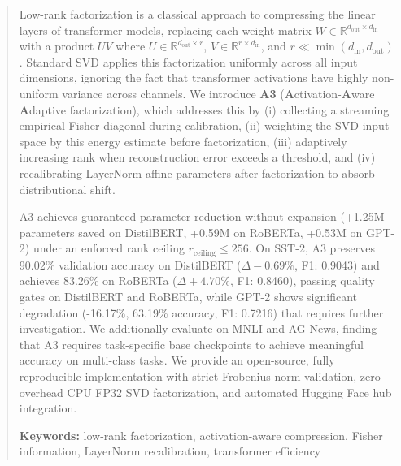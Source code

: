 \documentclass[10pt,twocolumn,letterpaper]{article}
\begin{document}
\maketitle

\begin{abstract}

Low-rank factorization is a classical approach to compressing the linear layers 
of transformer models, replacing each weight matrix $W \in \mathbb{R}^{d_\text{out} \times d_\text{in}}$ 
with a product $U V$ where $U \in \mathbb{R}^{d_\text{out} \times r}$, 
$V \in \mathbb{R}^{r \times d_\text{in}}$, and $r \ll \min(d_\text{in}, d_\text{out})$. 
Standard SVD applies this factorization uniformly across all input dimensions, 
ignoring the fact that transformer activations have highly non-uniform variance 
across channels. We introduce \textbf{A3} (\textbf{A}ctivation-\textbf{A}ware \textbf{A}daptive 
factorization), which addresses this by (i) collecting a streaming empirical 
Fisher diagonal during calibration, (ii) weighting the SVD input space by this 
energy estimate before factorization, (iii) adaptively increasing rank when 
reconstruction error exceeds a threshold, and (iv) recalibrating LayerNorm 
affine parameters after factorization to absorb distributional shift.

A3 achieves guaranteed parameter reduction without expansion (+1.25M parameters saved on DistilBERT, 
+0.59M on RoBERTa, +0.53M on GPT-2) under an enforced rank ceiling $r_{\mathrm{ceiling}} \le 256$. 
On SST-2, A3 preserves 90.02\% validation accuracy on DistilBERT ($\Delta -0.69\%$, F1: 0.9043) and 
achieves 83.26\% on RoBERTa ($\Delta +4.70\%$, F1: 0.8460), passing quality gates on DistilBERT and RoBERTa, 
while GPT-2 shows significant degradation (-16.17\%, 63.19\% accuracy, F1: 0.7216) that requires further investigation. 
We additionally evaluate on MNLI and AG News, finding that A3 requires task-specific base checkpoints to achieve meaningful accuracy on multi-class tasks. 
We provide an open-source, fully reproducible implementation with strict Frobenius-norm validation, 
zero-overhead CPU FP32 SVD factorization, and automated Hugging Face hub integration.

\textbf{Keywords:} low-rank factorization, activation-aware compression, Fisher 
information, LayerNorm recalibration, transformer efficiency
\end{abstract}

\vspace{1em}
\end{document}
